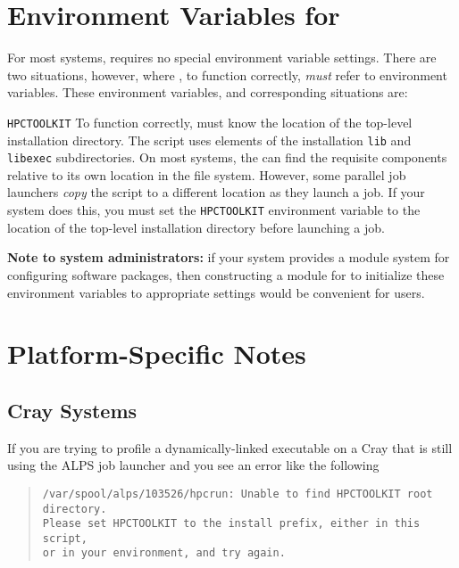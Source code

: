 \section{Environment Variables for \hpcrun{}}
\label{sec:env-vars}
For most systems, \hpcrun{} requires no special environment variable settings.
There are two situations, however, where \hpcrun{}, to function correctly,
\emph{must} refer to environment variables. These environment variables, and
corresponding situations are:
\begin{description}
  \item{\verb|HPCTOOLKIT|} To function correctly, \hpcrun{} must know
       the location of the \HPCToolkit{} top-level installation directory.
       The \hpcrun{} script uses elements of the installation \verb|lib| and
       \verb|libexec| subdirectories. On most systems, the 
       \hpcrun{} can find the requisite
       components relative to its own location in the file system. 
       However, some parallel job launchers \emph{copy} the
       \hpcrun{} script to a different location as they launch a job. If your
       system does this, you must set the \verb|HPCTOOLKIT|
       environment variable to the location of the \HPCToolkit{} top-level installation directory 
       before launching a job.
\end{description}

{\bf Note to system administrators:} if your system provides a module system for configuring 
software packages, then constructing
a module for \HPCToolkit{} to initialize these environment variables to appropriate settings
would be convenient for users.

\section{Platform-Specific Notes}
\label{sec:platform-specific}

%
%
\subsection{Cray Systems}

If you are trying to profile a dynamically-linked executable on a Cray that is still using the ALPS job launcher and you see an error like the following 

\begin{quote}
\begin{verbatim}
/var/spool/alps/103526/hpcrun: Unable to find HPCTOOLKIT root directory.
Please set HPCTOOLKIT to the install prefix, either in this script,
or in your environment, and try again.
\end{verbatim}
\end{quote}

